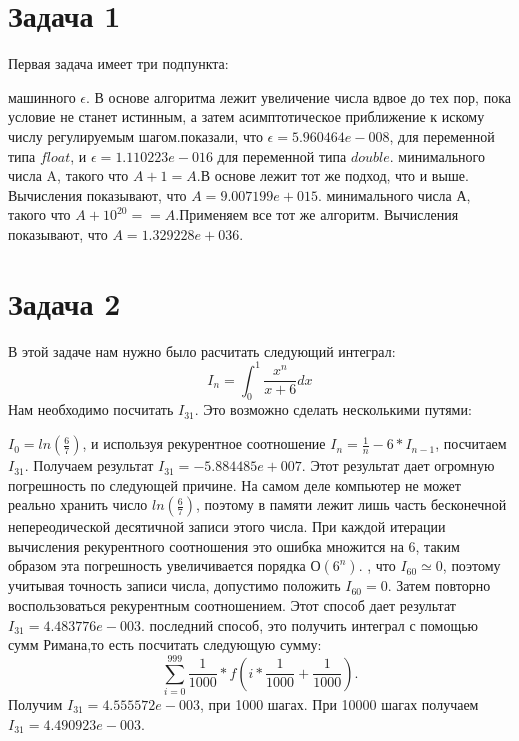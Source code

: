\documentclass[a4paper,12pt]{article}
\begin{document}
  
  \section*{Задача 1}

  Первая задача имеет три подпункта:
  \begin{itemize}
     машинного $\epsilon$. \n В основе алгоритма лежит увеличение числа вдвое до тех пор, пока условие не станет истинным, а затем асимптотическое приближение к искому числу регулируемым шагом. показали, что $\epsilon = 5.960464e-008$, для переменной типа $float$, и $\epsilon=1.110223e-016$ для переменной типа $double$.
     минимального числа A, такого что $A+1=A$.\n В основе лежит тот же подход, что и выше. Вычисления показывают, что $A=9.007199e+015$.
     минимального числа А, такого что $A+10^{20}==A$.\n Применяем все тот же алгоритм. Вычисления показывают, что $A=1.329228e+036$.
  \end{itemize}
    \pagebreak[1]
  \section*{Задача 2}
  В этой задаче нам нужно было расчитать следующий интеграл:
  $$I_n = \int_{0}^{1} \frac{x^n}{x+6} dx$$
  Нам необходимо посчитать $I_{31}$. Это возможно сделать несколькими путями:
  \begin{itemize}
     $I_0=ln(\frac{6}{7})$, и используя рекурентное соотношение $I_n=\frac{1}{n}-6*I_{n-1}$, посчитаем $I_{31}$. Получаем результат $I_{31}=-5.884485e+007$. Этот результат дает огромную погрешность по следующей причине. На самом деле компьютер не может реально хранить число $ln(\frac{6}{7})$, поэтому в памяти лежит лишь часть бесконечной непереодической десятичной записи этого числа. При каждой итерации вычисления рекурентного соотношения это ошибка множится на 6, таким образом эта погрешность увеличивается порядка $О(6^n)$.
    , что $I_{60}\simeq0$, поэтому учитывая точность записи числа, допустимо положить $I_{60}=0$. Затем повторно воспользоваться рекурентным соотношением. Этот способ дает результат $I_{31}=4.483776e-003$.
     последний способ, это получить интеграл с помощью сумм Римана,то есть посчитать следующую сумму: $$\sum_{i=0}^{999} \frac{1}{1000}*f(i*\frac{1}{1000}+\frac{1}{1000}).$$ Получим $I_{31}=4.555572e-003$, при 1000 шагах. При 10000 шагах получаем $I_{31}=4.490923e-003$.
  \end{itemize}
\newpage
\end{document}
